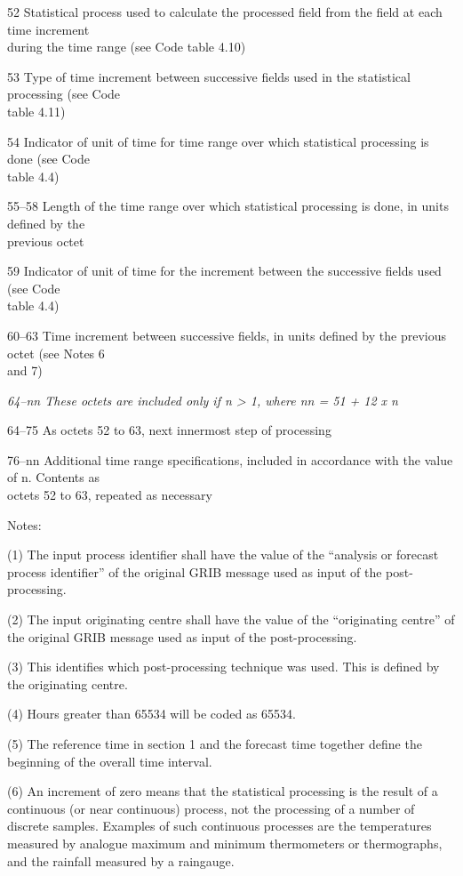 52 Statistical process used to calculate the processed field from the field at each time increment\\
during the time range (see Code table 4.10)

53 Type of time increment between successive fields used in the statistical processing (see Code\\
table 4.11)

54 Indicator of unit of time for time range over which statistical processing is done (see Code\\
table 4.4)

55--58 Length of the time range over which statistical processing is done, in units defined by the\\
previous octet

59 Indicator of unit of time for the increment between the successive fields used (see Code\\
table 4.4)

60--63 Time increment between successive fields, in units defined by the previous octet (see Notes 6\\
and 7)

\emph{64--nn These octets are included only if n \textgreater{} 1, where nn = 51 + 12 x n}

64--75 As octets 52 to 63, next innermost step of processing

76--nn Additional time range specifications, included in accordance with the value of n. Contents as\\
octets 52 to 63, repeated as necessary

Notes:

(1) The input process identifier shall have the value of the ``analysis or forecast process identifier'' of the original GRIB message used as input of the post-processing.

(2) The input originating centre shall have the value of the ``originating centre'' of the original GRIB message used as input of the post-processing.

(3) This identifies which post-processing technique was used. This is defined by the originating centre.

(4) Hours greater than 65534 will be coded as 65534.

(5) The reference time in section 1 and the forecast time together define the beginning of the overall time interval.

(6) An increment of zero means that the statistical processing is the result of a continuous (or near continuous) process, not the processing of a number of discrete samples. Examples of such continuous processes are the temperatures measured by analogue maximum and minimum thermometers or thermographs, and the rainfall measured by a raingauge.

